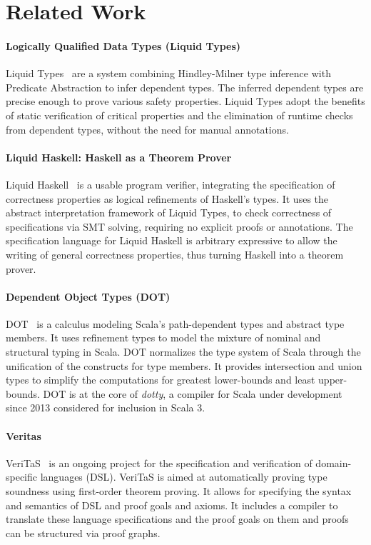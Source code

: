 \chapter{Related Work}
\label{chp:related}

\subsubsection{Logically Qualified Data Types (Liquid Types)}
Liquid Types~\cite{liquid-types} are a system
combining Hindley-Milner type inference with Predicate Abstraction
to infer dependent types.
The inferred dependent types are precise enough
to prove various safety properties.
Liquid Types adopt the benefits of
static verification of critical properties and
the elimination of runtime checks
from dependent types,
without the need for manual annotations.

\subsubsection{Liquid Haskell: Haskell as a Theorem Prover}
Liquid Haskell~\cite{liquid-haskell} is a usable
program verifier, integrating
the specification of correctness properties
as logical refinements of Haskell's types.
It uses the abstract interpretation framework of Liquid Types,
to check correctness of specifications via SMT solving,
requiring no explicit proofs or annotations.
The specification language for Liquid Haskell
is arbitrary expressive to allow
the writing of general correctness properties,
thus turning Haskell into a theorem prover.

\subsubsection{Dependent Object Types (DOT)}
DOT~\cite{dot1,dot2} is a calculus
modeling Scala's path-dependent types and abstract type members.
It uses refinement types to model the mixture of
nominal and structural typing in Scala.
DOT normalizes the type system of Scala
through the unification of the constructs for type members.
It provides intersection and union types
to simplify the computations for greatest lower-bounds
and least upper-bounds.
DOT is at the core of \textit{dotty},
a compiler for Scala under development since 2013
considered for inclusion in Scala 3.

\subsubsection{Veritas}
VeriTaS~\cite{veritas1,veritas2} is an ongoing project
for the specification and verification
of domain-specific languages (DSL).
VeriTaS is aimed at automatically proving type soundness 
using first-order theorem proving.
It allows for specifying
the syntax and semantics of DSL
and proof goals and axioms.
It includes a compiler to translate
these language specifications and the proof goals on them
and proofs can be structured via proof graphs.

